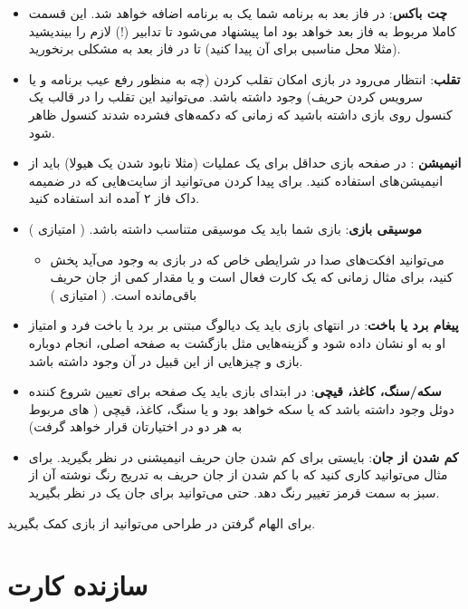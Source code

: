 \documentclass[]{article}
\begin{document}
\begin{itemize}
\begin{itemize}
    \end{itemize}
    \item \textbf{چت باکس}: در فاز بعد به برنامه شما یک  به برنامه اضافه خواهد شد. این قسمت کاملا مربوط به فاز بعد خواهد بود اما پیشنهاد می‌شود تا تدابیر (!) لازم را بیندیشید (مثلا محل مناسبی برای آن پیدا کنید) تا در فاز بعد به مشکلی برنخورید.
    \item \textbf{تقلب}:‌ انتظار می‌رود در بازی امکان تقلب کردن (چه به منظور رفع عیب برنامه و یا سرویس کردن حریف) وجود داشته باشد. می‌توانید این تقلب را در قالب یک کنسول  روی بازی داشته باشید که زمانی که دکمه‌های  فشرده شدند کنسول ظاهر شود.
    \item \textbf{انیمیشن }: در صفحه بازی حداقل برای یک عملیات (مثلا نابود شدن یک هیولا) باید از انیمیشن‌های  استفاده کنید. برای پیدا کردن  می‌توانید از سایت‌هایی که در ضمیمه داک فاز ۲ آمده اند استفاده کنید.
    \item \textbf{موسیقی بازی}: بازی شما باید یک موسیقی متناسب داشته باشد. ( امتیازی ) 
    \begin{itemize}
        \item می‌توانید افکت‌های صدا در شرایطی خاص که در بازی به وجود می‌آید پخش کنید، برای مثال زمانی که یک کارت  فعال است و یا مقدار کمی از جان حریف باقی‌مانده است. ( امتیازی‌ )
    \end{itemize}
    \item \textbf{پیغام برد یا باخت}: در انتهای بازی باید یک دیالوگ مبتنی بر برد یا باخت فرد و امتیاز او به او نشان داده شود و گزینه‌هایی مثل بازگشت به صفحه اصلی، انجام دوباره بازی و چیزهایی از این قبیل در آن وجود داشته باشد.
    \item \textbf{سکه/سنگ، کاغذ، قیچی}: در ابتدای بازی باید یک صفحه برای تعیین شروع کننده دوئل وجود داشته باشد که یا سکه خواهد بود و یا سنگ‌، کاغذ، قیچی (  های مربوط به هر دو در اختیارتان قرار خواهد گرفت)
    \item \textbf{کم شدن از جان}: بایستی برای کم شدن جان حریف انیمیشنی در نظر بگیرید. برای مثال می‌توانید کاری کنید که با کم شدن از جان حریف به تدریج رنگ نوشته آن از سبز به سمت قرمز تغییر رنگ دهد. حتی می‌توانید برای جان یک  در نظر بگیرید.
\end{itemize}
برای الهام گرفتن در طراحی می‌توانید از بازی  کمک بگیرید.

\section*{{\titr سازنده کارت}}
\end{document}
